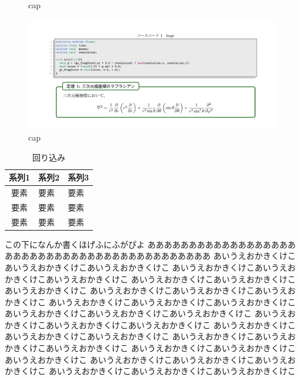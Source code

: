 \documentclass[uplatex,dvipdfmx,ja=standard,a4paper]{bxjsarticle}
\begin{document}
\begin{figure}[h]
\begin{minipage}[t]{0.24\columnwidth}
    \caption{cap}
    \label{fig:hoge3}
  \end{minipage}
  \begin{minipage}[t]{0.24\columnwidth}
    \centering
    \includegraphics[keepaspectratio, width=\columnwidth]{hoge.png}
    \caption{cap}
    \label{fig:hoge4}
  \end{minipage}
\end{figure}

\begin{table}
  \vspace*{-\intextsep}
  \caption{回り込み}
  \label{wraptable}
  \begin{tabular}{cll}
    \hline
    系列1 & 系列2 & 系列3 \\
    \hline
    要素 & 要素 & 要素 \\[-4pt]
    要素 & 要素 & 要素 \\[-4pt]
    要素 & 要素 & 要素 \\
    \hline
  \end{tabular}
\end{table}

この下になんか書くほげふにふがぴよ
ああああああああああああああああああ
あああああああああああああああああああああああああ
あいうえおかきくけこあいうえおかきくけこあいうえおかきくけこ
あいうえおかきくけこあいうえおかきくけこあいうえおかきくけこ
あいうえおかきくけこあいうえおかきくけこあいうえおかきくけこ
あいうえおかきくけこあいうえおかきくけこあいうえおかきくけこ
あいうえおかきくけこあいうえおかきくけこあいうえおかきくけこ
あいうえおかきくけこあいうえおかきくけこあいうえおかきくけこ
あいうえおかきくけこあいうえおかきくけこあいうえおかきくけこ
あいうえおかきくけこあいうえおかきくけこあいうえおかきくけこ
あいうえおかきくけこあいうえおかきくけこあいうえおかきくけこ
あいうえおかきくけこあいうえおかきくけこあいうえおかきくけこ
あいうえおかきくけこあいうえおかきくけこあいうえおかきくけこ
あいうえおかきくけこあいうえおかきくけこあいうえおかきくけこ
\end{document}
